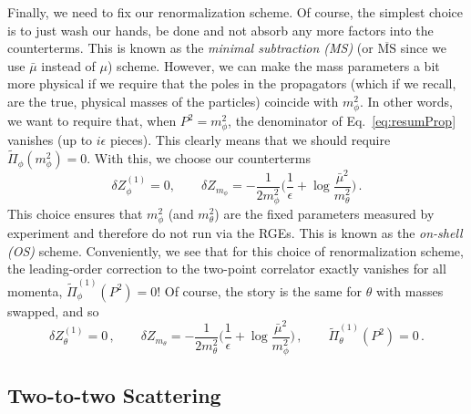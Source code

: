 \documentclass{article}
\newcommand{\td}[1]{\tilde{#1}}
\numberwithin{equation}{subsection}
\begin{document}
Finally, we need to fix our renormalization scheme. Of course, the simplest choice is to just wash our hands, be done and not absorb any more factors into the counterterms. 
This is known as the \textit{minimal subtraction (MS)} (or $\overline{\text{MS}}$ since we use $\bar\mu$ instead of $\mu$) scheme. However, we can make the mass parameters 
a bit more physical if we require that the poles in the propagators (which if we recall, are the true, physical masses of the particles) coincide with $m_\phi^2$. In other words, 
we want to require that, when $P^2 = m_\phi^2$, the denominator of Eq.~\eqref{eq:resumProp} vanishes (up to $i\epsilon$ pieces). This clearly means that we should require 
$\td\Pi_\phi(m_\phi^2) = 0$. With this, we choose our counterterms
\begin{equation}
    \delta Z_\phi^{(1)} = 0, \qquad \delta Z_{m_\phi} = -\frac{1}{2m_\phi^2}\Bigg(\frac{1}{\epsilon} + \log\frac{\bar\mu^2}{m_\theta^2}\Bigg)\,.
\end{equation}
This choice ensures that $m_\phi^2$ (and $m_\theta^2$) are the fixed parameters measured by experiment and therefore do not run via the RGEs. This is known as the \textit{on-shell (OS)} scheme. 
Conveniently, we see that for this choice of renormalization scheme, the leading-order correction to the two-point correlator exactly vanishes for all momenta, $\td\Pi_\phi^{(1)}(P^2) = 0$! 
Of course, the story is the same for $\theta$ with masses swapped, and so
\begin{equation}
    \delta Z_\theta^{(1)} = 0\,, \qquad \delta Z_{m_\theta} = -\frac{1}{2m_\theta^2}\Bigg(\frac{1}{\epsilon} + \log\frac{\bar{\mu}^2}{m_\phi^2}\Bigg)\,, \qquad \td{\Pi}_\theta^{(1)}(P^2) = 0\,.
\end{equation}

\subsection{Two-to-two Scattering}
\end{document}
